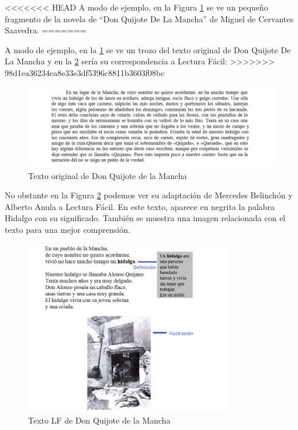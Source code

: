  \setlength{\parskip}{10pt}

<<<<<<< HEAD
A modo de ejemplo, en la Figura \ref{fig:Quijote} se ve un pequeño fragmento de la novela de ``Don Quijote De La Mancha'' de Miguel de Cervantes Saavedra. 
=======
 \setlength{\parskip}{10pt}
 
A modo de ejemplo, en la \ref{fig:Quijote} se ve un trozo del texto original de Don Quijote De La Mancha y en la \ref{fig:QuijoteLF} sería su correspondencia a Lectura Fácil:
>>>>>>> 98d1ea36234ea8e33e3df5396c8811b3603f08bc


\begin{figure}[htb]
	\centering
	\includegraphics[width=1.10\textwidth]{Imagenes/Ejemplos/Cap1DonQuijote}
	\caption{Texto original de Don Quijote de la Mancha}
	\label{fig:Quijote}
\end{figure} 
No obstante en la Figura \ref{fig:QuijoteLF} podemos ver su adaptación de Mercedes Belinchón y Alberto Anula a Lectura Fácil. En este texto, aparece en negrita la palabra Hidalgo con su significado. También se muestra una imagen relacionada con el texto para una mejor comprensión.

\begin{figure}[htb]
	\centering
	\includegraphics[width=0.8\textwidth]{Imagenes/Ejemplos/Cap1DonQuijoteLF}
	\caption{Texto LF de Don Quijote de la Mancha}
	\label{fig:QuijoteLF}
\end{figure}



